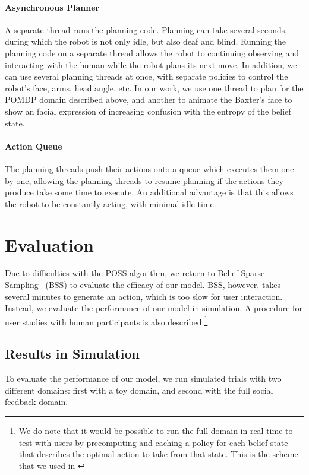 \documentclass{article}
\begin{document}
\begin{multicols}{2}
\paragraph{Asynchronous Planner} A separate thread runs the planning code. Planning can take several seconds, during which the robot is not only idle, but also deaf and blind. Running the planning code on a separate thread allows the robot to continuing observing and interacting with the human while the robot plans its next move. In addition, we can use several planning threads at once, with separate policies to control the robot's face, arms, head angle, etc. In our work, we use one thread to plan for the POMDP domain described above, and another to animate the Baxter's face to show an facial expression of increasing confusion with the entropy of the belief state. 

\paragraph{Action Queue} The planning threads push their actions onto a queue which executes them one by one, allowing the planning threads to resume planning if the actions they produce take some time to execute. An additional advantage is that this allows the robot to be constantly acting, with minimal idle time. 

\section{Evaluation}

Due to difficulties with the POSS algorithm, we return to Belief Sparse Sampling~\citep{bss} (BSS) to evaluate the efficacy of our model. BSS, however, takes several minutes to generate an action, which is too slow for user interaction. Instead, we evaluate the performance of our model in simulation. A procedure for user studies with human participants is also described.\footnote{We do note that it would be possible to run the full domain in real time to test with users by precomputing and caching a policy for each belief state that describes the optimal action to take from that state. This is the scheme that we used in \cite{socialfeedback}}

\subsection{Results in Simulation}

To evaluate the performance of our model, we run simulated trials with two different domains: first with a toy domain, and second with the full social feedback domain. 

\end{multicols}
\end{document}
